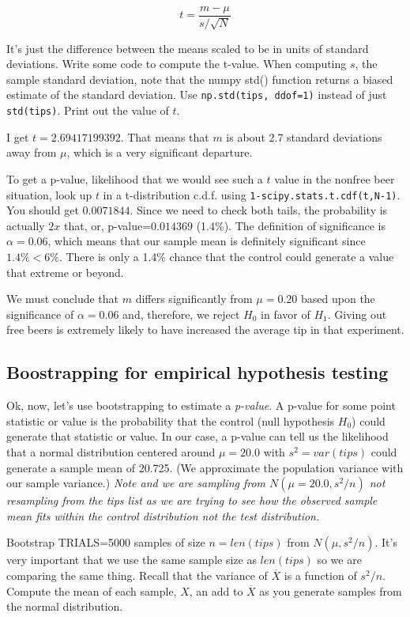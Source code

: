 \begin{fullwidth}
\[\tag{t-value}
t = \frac{m - \mu}{s / \sqrt{N}}
\]

\noindent It's just the difference between the means scaled to be in units of standard deviations.  Write some code to compute the t-value. When computing $s$, the sample standard deviation, note that the numpy std() function returns a biased estimate of the standard deviation. Use {\tt np.std(tips, ddof=1)} instead of just {\tt std(tips)}. Print out the value of $t$.

I get $t = 2.69417199392$. That means that $m$ is about 2.7 standard deviations away from $\mu$, which is a very significant departure. 

\step  To get a p-value, likelihood that we would see such a $t$ value in the nonfree beer situation, look up $t$ in a t-distribution c.d.f. using {\tt 1-scipy.stats.t.cdf(t,N-1)}. You should get $0.0071844$. Since we need to check both tails, the probability is actually $2x$ that, or, p-value=$0.014369$ (1.4\%). The definition of significance is $\alpha = 0.06$, which means that our sample mean is definitely significant since $1.4\% < 6\%$.  There is only a 1.4\% chance that the control could generate a value that extreme or beyond.

We must conclude that $m$ differs significantly from $\mu = 0.20$ based upon the significance of $\alpha=0.06$ and, therefore, we reject $H_0$ in favor of $H_1$.  Giving out free beers is extremely likely to have increased the average tip in that experiment.

\subsection{Boostrapping for empirical hypothesis testing}

\setcounter{problem}{1}

Ok, now, let's use bootstrapping to estimate a {\em p-value}. A p-value for some point statistic or value is the probability that the control (null hypothesis $H_0$) could generate that statistic or value. In our case, a p-value can tell us the likelihood that a normal distribution centered around $\mu=20.0$ with $s^2=var(tips)$ could generate a sample mean of 20.725. (We approximate the population variance with our sample variance.) {\em Note and we are sampling from $N(\mu=20.0,s^2/n)$ not resampling from the tips list as we are trying to see how the observed sample mean fits within the control distribution not the test distribution.}

\step Bootstrap TRIALS=5000 samples of size $n=len(tips)$ from $N(\mu, s^2/n)$. It's very important that we use the same sample size as $len(tips)$ so we are comparing the same thing. Recall that the variance of $\overline{X}$ is a function of $s^2/n$. Compute the mean of each sample, $X$, an add to $\overline{X}$ as you generate samples from the normal distribution.


\end{fullwidth}
